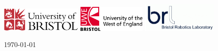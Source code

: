 \begin{titlepage}
\includegraphics[width=0.3\textwidth]{images/University_of_Bristol_logo.png}
\hspace{5mm}
\includegraphics[width=0.25\textwidth]{images/UWE_logo.jpg}
\hspace{5mm}
\includegraphics[width=0.28\textwidth]{images/BRL_logo.PNG}

\vspace{2cm}

{\large \today}\\[1cm] %

\vfill %

\end{titlepage}
